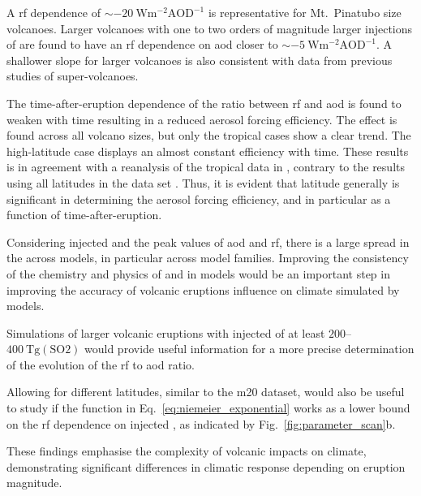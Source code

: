 \documentclass{ametsocV6.1}
\newcommand{\iso}[1][i]{{#1}njected \ce{SO2}}
\begin{document}
A \gls{rf} dependence of \(\sim\SI{-20}{\watt\metre^{-2}\mathrm{AOD}^{-1}}\) is
representative for Mt.\ Pinatubo size volcanoes. Larger volcanoes with one to two orders
of magnitude larger injections of  are found to have an \gls{rf} dependence on
\gls{aod} closer to \(\sim \SI{-5}{\watt\metre^{-2}\mathrm{AOD}^{-1}}\). A shallower
slope for larger volcanoes is also consistent with data from previous studies of
super-volcanoes.

The time-after-eruption dependence of the ratio between \gls{rf} and \gls{aod} is found
to weaken with time resulting in a reduced aerosol forcing efficiency. The effect is
found across all volcano sizes, but only the tropical cases show a clear trend. The
high-latitude case displays an almost constant efficiency with time. These results is in
agreement with a reanalysis of the tropical data in \citet{marshall2020dataset},
contrary to the results using all latitudes in the data set \citet{marshall2020}.
Thus, it is evident that latitude generally is significant in determining the aerosol
forcing efficiency, and in particular as a function of time-after-eruption.

Considering \iso{} and the peak values of \gls{aod} and \gls{rf}, there is a large
spread in the across models, in particular across model families. Improving the
consistency of the chemistry and physics of  and  in models would be
an important step in improving the accuracy of volcanic eruptions influence on climate
simulated by models.

Simulations of larger volcanic eruptions with \iso{} of at least
\(200\)--\(\SI{400}{\tera\gram(\mathrm{SO2})}\) would provide useful information for a
more precise determination of the evolution of the \gls{rf} to \gls{aod} ratio.

Allowing for different latitudes, similar to the \gls{m20} dataset, would also be useful
to study if the function in Eq.~\ref{eq:niemeier_exponential} works as a lower bound on
the \gls{rf} dependence on \iso{}, as indicated by Fig.~\ref{fig:parameter_scan}b.

These findings emphasise the complexity of volcanic impacts on climate, demonstrating
significant differences in climatic response depending on eruption magnitude.
\end{document}
